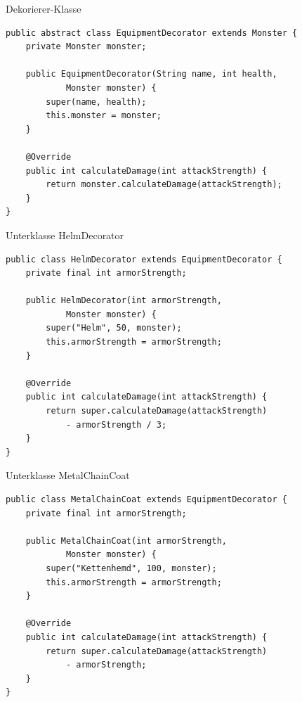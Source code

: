 \begin{frame}[fragile]{Dekorierer-Klasse}
	\begin{exampleblock}{}
        \begin{lstlisting}
public abstract class EquipmentDecorator extends Monster {
	private Monster monster;

	public EquipmentDecorator(String name, int health, 
            Monster monster) {
		super(name, health);
		this.monster = monster;
	}

	@Override
	public int calculateDamage(int attackStrength) {
		return monster.calculateDamage(attackStrength);
	}
}        
        \end{lstlisting}
	\end{exampleblock}
\end{frame}

\begin{frame}[fragile]{Unterklasse HelmDecorator}
	\begin{exampleblock}{}
        \begin{lstlisting}
public class HelmDecorator extends EquipmentDecorator {
	private final int armorStrength;

	public HelmDecorator(int armorStrength, 
            Monster monster) {
		super("Helm", 50, monster);
		this.armorStrength = armorStrength;
	}

	@Override
	public int calculateDamage(int attackStrength) {
		return super.calculateDamage(attackStrength) 
            - armorStrength / 3;
	}
}
        \end{lstlisting}
	\end{exampleblock}
\end{frame}

\begin{frame}[fragile]{Unterklasse MetalChainCoat}
	\begin{exampleblock}{}
        \begin{lstlisting}
public class MetalChainCoat extends EquipmentDecorator {
	private final int armorStrength;

	public MetalChainCoat(int armorStrength, 
            Monster monster) {
		super("Kettenhemd", 100, monster);
		this.armorStrength = armorStrength;
	}

	@Override
	public int calculateDamage(int attackStrength) {
		return super.calculateDamage(attackStrength) 
            - armorStrength;
	}
}        
        \end{lstlisting}
	\end{exampleblock}
\end{frame}

